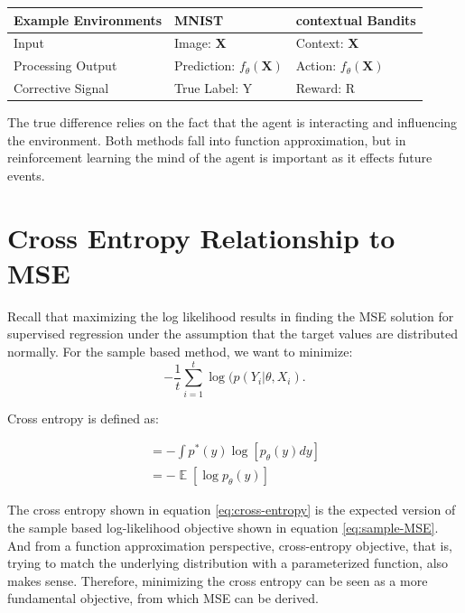 \documentclass[twoside]{article}
\DeclareMathOperator{\E}{\mathbb{E}}
\begin{document}
\begin{table}[H]
\begin{tabular}{|l|l|l|}
\hline
Example Environments & MNIST       & contextual Bandits \\ \hline
Input                & Image: \textbf{X}    & Context: \textbf{X}      \\ \hline
Processing Output    & Prediction: $f_\theta(\textbf{X})$ & Action: $f_\theta(\textbf{X})$          \\ \hline
Corrective Signal    & True Label: Y  & Reward: R          \\ \hline
\end{tabular}
\end{table}

The true difference relies on the fact that the agent is interacting and influencing the environment. Both methods fall into function approximation, but in reinforcement learning the mind of the agent is important as it effects future events.

\section{Cross Entropy Relationship to MSE}

Recall that maximizing the log likelihood results in finding the MSE solution for supervised regression under the assumption that the target values are distributed normally. For the sample based method, we want to minimize:
\begin{equation}
    \label{eq:sample-MSE}
 -  \frac{1}{t}\sum_{i=1}^{t}\log(p(Y_i|\theta,X_i).
\end{equation}

Cross entropy is defined as:

\begin{equation}
    \label{eq:cross-entropy}
    \begin{split}
        = -\int p^*(y)\log[p_\theta(y)dy] \\
        = -\E[\log p_\theta(y)]
    \end{split}
\end{equation}

The cross entropy shown in equation \ref{eq:cross-entropy} is the expected version of the sample based log-likelihood objective shown in equation \ref{eq:sample-MSE}. 
And from a function approximation perspective, cross-entropy objective, that is, trying to match the underlying distribution with a parameterized function, also makes sense.
Therefore, minimizing the cross entropy can be seen as a more fundamental objective, from which MSE can be derived.
\end{document}
